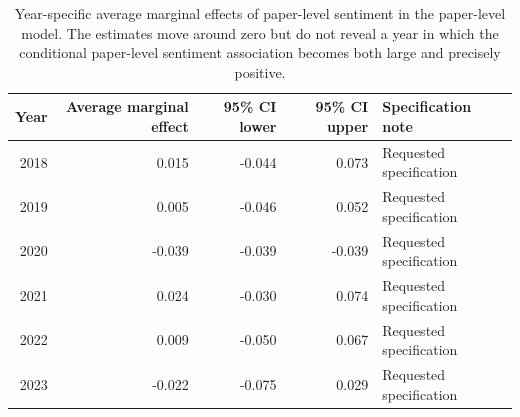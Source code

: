 \begin{table}[!htbp]
\centering
\begingroup
\scriptsize
\renewcommand{\arraystretch}{1.20}
\setlength{\tabcolsep}{6pt}
\caption{Within-score-bin bridge diagnostics. Bins are based on the within-year percentile of paper-level mean score. The table underlies the bridge figure and shows numerically that the accepted-minus-rejected sentiment gap is much smaller in the central score bins than in the extreme bins where acceptance is nearly certain or nearly impossible.}
\label{tab:app:bridge}
\endgroup
\end{table}

\begin{table}[!htbp]
\centering
\begingroup
\small
\renewcommand{\arraystretch}{1.20}
\setlength{\tabcolsep}{6pt}
\caption{Year-specific average marginal effects of paper-level sentiment in the paper-level model. The estimates move around zero but do not reveal a year in which the conditional paper-level sentiment association becomes both large and precisely positive.}
\label{tab:app:heteroyear}
\begin{tabular}{rrrrl}
\toprule
Year & Average marginal effect & 95\% CI lower & 95\% CI upper & Specification note \\
\midrule
2018 & 0.015 & -0.044 & 0.073 & Requested specification \\
2019 & 0.005 & -0.046 & 0.052 & Requested specification \\
2020 & -0.039 & -0.039 & -0.039 & Requested specification \\
2021 & 0.024 & -0.030 & 0.074 & Requested specification \\
2022 & 0.009 & -0.050 & 0.067 & Requested specification \\
2023 & -0.022 & -0.075 & 0.029 & Requested specification \\
\bottomrule
\end{tabular}
\endgroup
\end{table}

